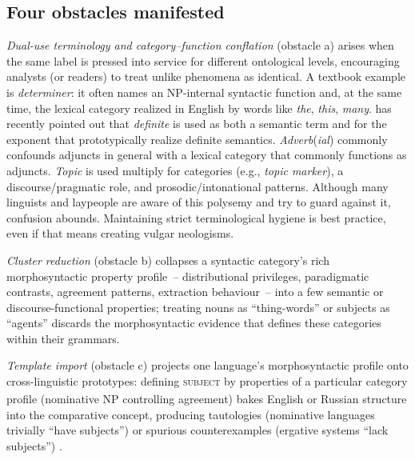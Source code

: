 \documentclass[12pt]{article}
\newcommand{\term}[1]{\textit{#1}}
\begin{document}
\subsection{Four obstacles manifested}\label{subsec:failure-modes}

\emph{Dual-use terminology and category--function conflation} (obstacle a) arises when the same label is pressed into service for different ontological levels, encouraging analysts (or readers) to treat unlike phenomena as identical. A textbook example is \term{determiner}: it often names an NP-internal syntactic function and, at the same time, the lexical category realized in English by words like \textit{the}, \textit{this}, \textit{many}.  \textcite{Reynolds2025Definiteness} has recently pointed out that \textit{definite} is used as both a semantic term and for the exponent that prototypically realize definite semantics. \textit{Adverb}(\textit{ial}) commonly confounds adjuncts in general with a lexical category that commonly functions as adjuncts. \textit{Topic} is used multiply for categories (e.g., \textit{topic marker}), a discourse/pragmatic role, and prosodic/intonational patterns. Although many linguists and laypeople are aware of this polysemy and try to guard against it, confusion abounds. Maintaining strict terminological hygiene is best practice, even if that means creating vulgar neologisms.

\emph{Cluster reduction} (obstacle b) collapses a syntactic category's rich morphosyntactic property profile~-- distributional privileges, paradigmatic contrasts, agreement patterns, extraction behaviour~-- into a few semantic or discourse-functional properties; treating nouns as \enquote{thing-words} or subjects as \enquote{agents} discards the morphosyntactic evidence that defines these categories within their grammars.

\emph{Template import} (obstacle c) projects one language's morphosyntactic profile onto cross-linguistic prototypes: defining \textsc{subject}\textsubscript{\Cross} by properties of a particular category profile (nominative NP controlling agreement) bakes English or Russian structure into the comparative concept, producing tautologies (nominative languages trivially \enquote{have subjects}) or spurious counterexamples (ergative systems \enquote{lack subjects}) \parencite{Dryer1997,EvansLevinson2009}.
\end{document}
